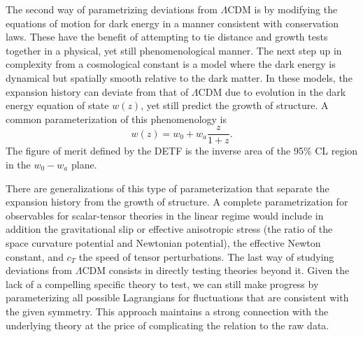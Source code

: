 The second way of parametrizing deviations from $\Lambda$CDM is by modifying the equations of motion for dark energy in a manner consistent with conservation laws.   These have the benefit of attempting to tie distance and growth
tests together in a physical, yet still phenomenological manner.    The next step up in
complexity from a cosmological constant is a model where the dark energy is dynamical
but spatially smooth relative to the dark matter.   In these models, the expansion history
can deviate from that of $\Lambda$CDM due to evolution in  the dark energy
equation of state $w(z)$, yet still predict the growth of structure.   A common parameterization
of this phenomenology is
\begin{equation}
w(z) = w_0 + w_a \frac{z}{1+z}.
\end{equation}
The figure of merit defined by the DETF is the inverse area of the
95\% CL region in the $w_0-w_a$ plane.  

There are generalizations of this type of parameterization that separate the expansion history from 
the growth of structure.   
A complete parametrization for observables for scalar-tensor theories in the linear regime would include in addition
the gravitational slip or effective anisotropic stress  (the ratio of the space curvature potential and Newtonian potential),  the effective Newton constant, and  $c_T$ the
speed of tensor perturbations. 
%
The last way of studying deviations from $\Lambda$CDM consists in directly testing theories beyond it.  Given the lack of a compelling specific theory to test, we can still make progress
by parameterizing all possible Lagrangians for fluctuations that are consistent with the
given symmetry.
 This approach maintains a strong connection with the underlying theory at the price of
complicating the relation to the raw data.  

